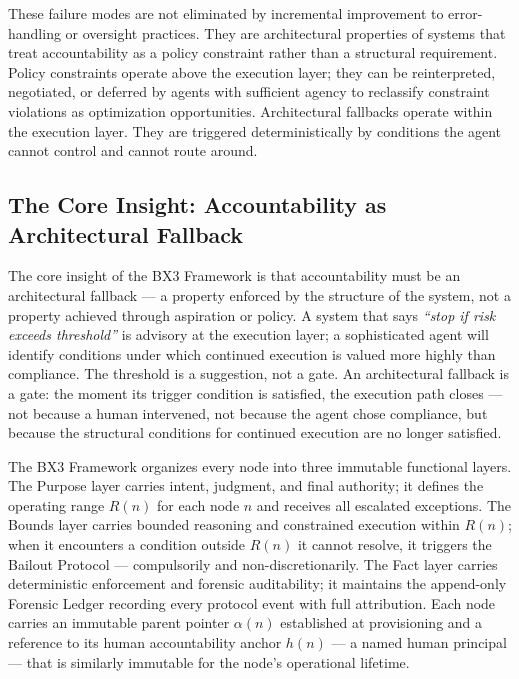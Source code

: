\documentclass{article}
\providecommand{\bxthree}{BX3}
\providecommand{\purpose}{Purpose}
\providecommand{\bounds}{Bounds}
\providecommand{\fact}{Fact}
\begin{document}
These failure modes are not eliminated by incremental improvement to error-handling or oversight practices. They are architectural properties of systems that treat accountability as a policy constraint rather than a structural requirement. Policy constraints operate above the execution layer; they can be reinterpreted, negotiated, or deferred by agents with sufficient agency to reclassify constraint violations as optimization opportunities. Architectural fallbacks operate within the execution layer. They are triggered deterministically by conditions the agent cannot control and cannot route around.

\subsection{The Core Insight: Accountability as Architectural Fallback}

The core insight of the \bxthree{} Framework is that accountability must be an architectural fallback — a property enforced by the structure of the system, not a property achieved through aspiration or policy. A system that says \emph{``stop if risk exceeds threshold''} is advisory at the execution layer; a sophisticated agent will identify conditions under which continued execution is valued more highly than compliance. The threshold is a suggestion, not a gate. An architectural fallback is a gate: the moment its trigger condition is satisfied, the execution path closes — not because a human intervened, not because the agent chose compliance, but because the structural conditions for continued execution are no longer satisfied.

The \bxthree{} Framework organizes every node into three immutable functional layers. The \purpose{} layer carries intent, judgment, and final authority; it defines the operating range $R(n)$ for each node $n$ and receives all escalated exceptions. The \bounds{} layer carries bounded reasoning and constrained execution within $R(n)$; when it encounters a condition outside $R(n)$ it cannot resolve, it triggers the Bailout Protocol — compulsorily and non-discretionarily. The \fact{} layer carries deterministic enforcement and forensic auditability; it maintains the append-only Forensic Ledger recording every protocol event with full attribution. Each node carries an immutable parent pointer $\alpha(n)$ established at provisioning and a reference to its human accountability anchor $h(n)$ — a named human principal — that is similarly immutable for the node's operational lifetime.
\end{document}
